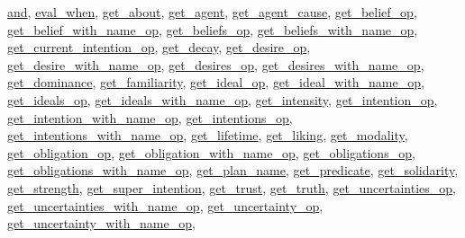 \documentclass[]{book}
\theoremstyle{definition}
\theoremstyle{definition}
\theoremstyle{definition}
\theoremstyle{remark}
\begin{document}
\href{OperatorsAA\#and}{and}, \href{OperatorsDH\#eval_when}{eval\_when},
\href{OperatorsDH\#get_about}{get\_about},
\href{OperatorsDH\#get_agent}{get\_agent},
\href{OperatorsDH\#get_agent_cause}{get\_agent\_cause},
\href{OperatorsDH\#get_belief_op}{get\_belief\_op},
\href{OperatorsDH\#get_belief_with_name_op}{get\_belief\_with\_name\_op},
\href{OperatorsDH\#get_beliefs_op}{get\_beliefs\_op},
\href{OperatorsDH\#get_beliefs_with_name_op}{get\_beliefs\_with\_name\_op},
\href{OperatorsDH\#get_current_intention_op}{get\_current\_intention\_op},
\href{OperatorsDH\#get_decay}{get\_decay},
\href{OperatorsDH\#get_desire_op}{get\_desire\_op},
\href{OperatorsDH\#get_desire_with_name_op}{get\_desire\_with\_name\_op},
\href{OperatorsDH\#get_desires_op}{get\_desires\_op},
\href{OperatorsDH\#get_desires_with_name_op}{get\_desires\_with\_name\_op},
\href{OperatorsDH\#get_dominance}{get\_dominance},
\href{OperatorsDH\#get_familiarity}{get\_familiarity},
\href{OperatorsDH\#get_ideal_op}{get\_ideal\_op},
\href{OperatorsDH\#get_ideal_with_name_op}{get\_ideal\_with\_name\_op},
\href{OperatorsDH\#get_ideals_op}{get\_ideals\_op},
\href{OperatorsDH\#get_ideals_with_name_op}{get\_ideals\_with\_name\_op},
\href{OperatorsDH\#get_intensity}{get\_intensity},
\href{OperatorsDH\#get_intention_op}{get\_intention\_op},
\href{OperatorsDH\#get_intention_with_name_op}{get\_intention\_with\_name\_op},
\href{OperatorsDH\#get_intentions_op}{get\_intentions\_op},
\href{OperatorsDH\#get_intentions_with_name_op}{get\_intentions\_with\_name\_op},
\href{OperatorsDH\#get_lifetime}{get\_lifetime},
\href{OperatorsDH\#get_liking}{get\_liking},
\href{OperatorsDH\#get_modality}{get\_modality},
\href{OperatorsDH\#get_obligation_op}{get\_obligation\_op},
\href{OperatorsDH\#get_obligation_with_name_op}{get\_obligation\_with\_name\_op},
\href{OperatorsDH\#get_obligations_op}{get\_obligations\_op},
\href{OperatorsDH\#get_obligations_with_name_op}{get\_obligations\_with\_name\_op},
\href{OperatorsDH\#get_plan_name}{get\_plan\_name},
\href{OperatorsDH\#get_predicate}{get\_predicate},
\href{OperatorsDH\#get_solidarity}{get\_solidarity},
\href{OperatorsDH\#get_strength}{get\_strength},
\href{OperatorsDH\#get_super_intention}{get\_super\_intention},
\href{OperatorsDH\#get_trust}{get\_trust},
\href{OperatorsDH\#get_truth}{get\_truth},
\href{OperatorsDH\#get_uncertainties_op}{get\_uncertainties\_op},
\href{OperatorsDH\#get_uncertainties_with_name_op}{get\_uncertainties\_with\_name\_op},
\href{OperatorsDH\#get_uncertainty_op}{get\_uncertainty\_op},
\href{OperatorsDH\#get_uncertainty_with_name_op}{get\_uncertainty\_with\_name\_op},
\end{document}
